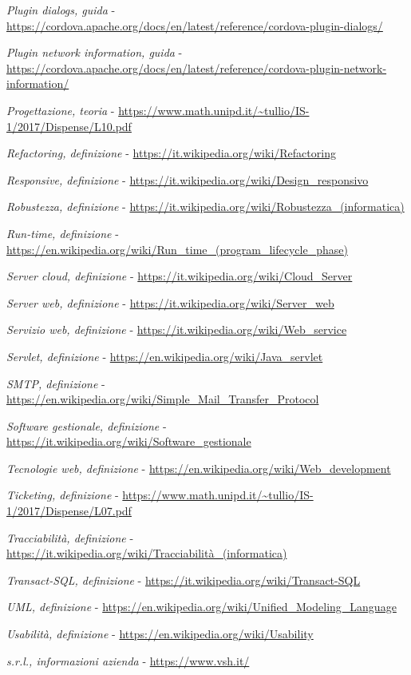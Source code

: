 \begin{enumerate}[label={[\arabic*]}]
	\item \textit{Plugin dialogs, guida} - \url{https://cordova.apache.org/docs/en/latest/reference/cordova-plugin-dialogs/}
	\item \textit{Plugin network information, guida} - \url{https://cordova.apache.org/docs/en/latest/reference/cordova-plugin-network-information/}
	\item \textit{Progettazione, teoria} - \url{https://www.math.unipd.it/~tullio/IS-1/2017/Dispense/L10.pdf}
	\item \textit{Refactoring, definizione} - \url{https://it.wikipedia.org/wiki/Refactoring}
	\item \textit{Responsive, definizione} - \url{https://it.wikipedia.org/wiki/Design_responsivo}
	\item \textit{Robustezza, definizione} - \url{https://it.wikipedia.org/wiki/Robustezza_(informatica)}
	\item \textit{Run-time, definizione} - \url{https://en.wikipedia.org/wiki/Run_time_(program_lifecycle_phase)}
	\item \textit{Server cloud, definizione} - \url{https://it.wikipedia.org/wiki/Cloud_Server}
	\item \textit{Server web, definizione} - \url{https://it.wikipedia.org/wiki/Server_web} 
	\item \textit{Servizio web, definizione} - \url{https://it.wikipedia.org/wiki/Web_service} 
	\item \textit{Servlet, definizione} - \url{https://en.wikipedia.org/wiki/Java_servlet}
	\item \textit{SMTP, definizione} - \url{https://en.wikipedia.org/wiki/Simple_Mail_Transfer_Protocol} 
	\item \textit{Software gestionale, definizione} - \url{https://it.wikipedia.org/wiki/Software_gestionale}
	\item \textit{Tecnologie web, definizione} - \url{https://en.wikipedia.org/wiki/Web_development}
	\item \textit{Ticketing, definizione} - \url{https://www.math.unipd.it/~tullio/IS-1/2017/Dispense/L07.pdf}
	\item \textit{Tracciabilità, definizione} - \url{https://it.wikipedia.org/wiki/Tracciabilità_(informatica)} 
	\item \textit{Transact-SQL, definizione} - \url{https://it.wikipedia.org/wiki/Transact-SQL} 
	\item \textit{UML, definizione} - \url{https://en.wikipedia.org/wiki/Unified_Modeling_Language} 
	\item \textit{Usabilità, definizione} - \url{https://en.wikipedia.org/wiki/Usability}
	\item \textit{\visione{} s.r.l., informazioni azienda} - \url{https://www.vsh.it/} 
\end{enumerate}